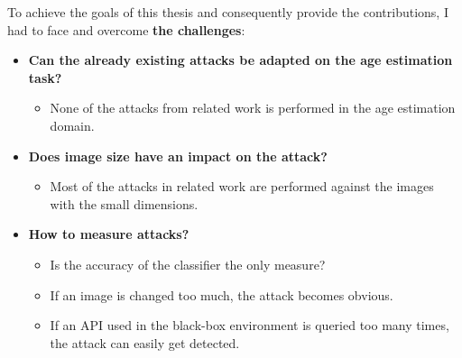 To achieve the goals of this thesis and consequently provide the contributions, I had to face and overcome \textbf{the challenges}: 
\begin{itemize}

\item \textbf{Can the already existing attacks be adapted on the age estimation task?}
	\begin{itemize}
		\item None of the attacks from related work is performed in the age estimation domain.
	\end{itemize}
	
\item \textbf{Does image size have an impact on the attack?}
	\begin{itemize}
	\item Most of the attacks in related work are performed against the images with the small dimensions.
	\end{itemize}
	
\item \textbf{How to measure attacks?}
	\begin{itemize}
	\item Is the accuracy of the classifier the only measure? 
	\item If an image is changed too much, the attack becomes obvious.
	\item If an API used in the black-box environment is queried too many times, the attack can easily get detected.
	\end{itemize}
\end{itemize}


